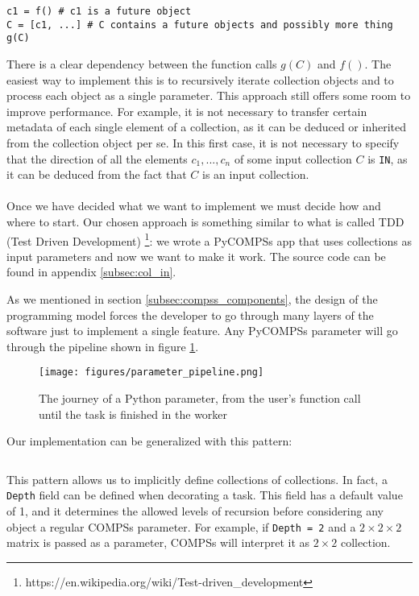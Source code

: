 \begin{verbatim}
c1 = f() # c1 is a future object
C = [c1, ...] # C contains a future objects and possibly more thing
g(C)
\end{verbatim}
There is a clear dependency between the function calls $g(C)$ and $f()$. The easiest way to implement this is to recursively iterate collection objects and to process each object as a single parameter. This approach still offers some room to improve performance. For example, it is not necessary to transfer certain metadata of each single element of a collection, as it can be deduced or inherited from the collection object per se. In this first case, it is not necessary to specify that the direction of all the elements $c_1, ..., c_n$ of some input collection $C$ is \verb|IN|, as it can be deduced from the fact that $C$ is an input collection.\\
\\
Once we have decided what we want to implement we must decide how and where to start. Our chosen approach is something similar to what is called TDD (Test Driven Development) \footnote{https://en.wikipedia.org/wiki/Test-driven\_development}: we wrote a PyCOMPSs app that uses collections as input parameters and now we want to make it work. The source code can be found in appendix \ref{subsec:col_in}.

As we mentioned in section \ref{subsec:compss_components}, the design of the programming model forces the developer to go through many layers of the software just to implement a single feature. Any PyCOMPSs parameter will go through the pipeline shown in figure \ref{fig:parameter_pipeline}.

\begin{figure}[ht!]
\centering
\texttt{[image: figures/parameter\_pipeline.png]}
\caption{The journey of a Python parameter, from the user's function call until the task is finished in the worker}
\label{fig:parameter_pipeline}
\end{figure}

Our implementation can be generalized with this pattern:

\inputminted{python}{snippets/collection_pattern.py}

This pattern allows us to implicitly define collections of collections. In fact, a \verb|Depth| field can be defined when decorating a task. This field has a default value of 1, and it determines the allowed levels of recursion before considering any object a regular COMPSs parameter. For example, if \verb|Depth = 2| and a $2 \times 2 \times 2$ matrix is passed as a parameter, COMPSs will interpret it as $2 \times 2$ collection.

